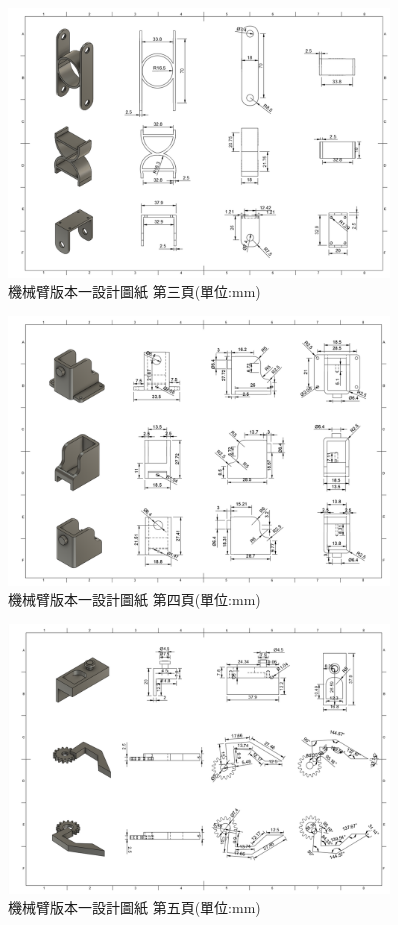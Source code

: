 \documentclass[class=NCU_thesis, crop=false]{standalone}
\begin{document}
\begin{figure}[htbp]
    \centering
    \includegraphics[width=0.9\textwidth]{figures/Armv1 (3).PNG}
    \caption{機械臂版本一設計圖紙 第三頁(單位:mm)}
\end{figure}

\begin{figure}[htbp]
    \centering
    \includegraphics[width=0.9\textwidth]{figures/Armv1 (4).PNG}
    \caption{機械臂版本一設計圖紙 第四頁(單位:mm)}
\end{figure}

\begin{figure}[htbp]
    \centering
    \includegraphics[width=0.9\textwidth]{figures/Armv1 (5).PNG}
    \caption{機械臂版本一設計圖紙 第五頁(單位:mm)}
\end{figure}
\end{document}
